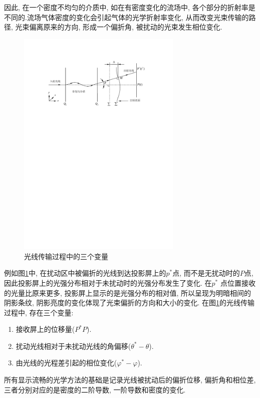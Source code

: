 \documentclass[12pt,a4paper,boxed,titlepage]{caspset}
\begin{document}
因此, 在一个密度不均匀的介质中, 如在有密度变化的流场中, 各个部分的折射率是不同的.流场气体密度的变化会引起气体的光学折射率变化, 从而改变光束传输的路径, 光束偏离原来的方向, 形成一个偏折角, 被扰动的光束发生相位变化.
\begin{figure}[!htb]
\centering
\includegraphics[width=0.7\textwidth]{optics.pdf}
\caption{\label{optics}光线传输过程中的三个变量}
\end{figure}
例如图\ref{optics}中, 在扰动区中被偏折的光线到达投影屏上的$p^*$点, 而不是无扰动时的$P$点, 因此投影屏上的光强分布相对于未扰动时的光强分布发生了变化. 在$p^*$ 点位置接收的光量比原来更多, 投影屏上显示的是光强分布的相对值, 所以呈现为明暗相间的阴影条纹, 阴影亮度的变化体现了光束偏折的方向和大小的变化. 在图\ref{optics}的光线传输过程中, 存在三个变量:
\begin{enumerate}
\item 接收屏上的位移量($P^*P$).
\item 扰动光线相对于未扰动光线的角偏移($\theta^*-\theta$).
\item 由光线的光程差引起的相位变化($\varphi^*-\varphi$).
\end{enumerate}
所有显示流畅的光学方法的基础是记录光线被扰动后的偏折位移, 偏折角和相位差, 三者分别对应的是密度的二阶导数, 一阶导数和密度的变化.
\end{document}
